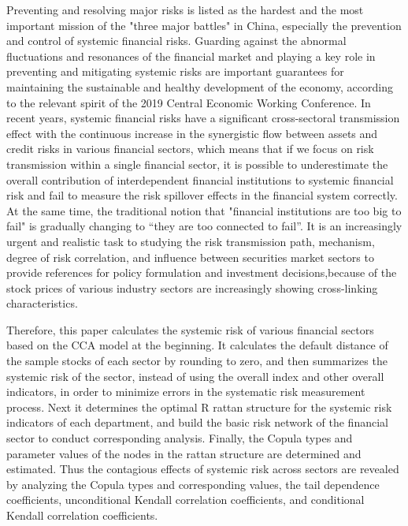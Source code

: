 \begin{eabstract}
  Preventing and resolving major risks is listed as the hardest and the most
  important mission of the "three major battles" in China, especially the
  prevention and control of systemic financial risks. Guarding against the
  abnormal fluctuations and resonances of the financial market and playing a key
  role in preventing and mitigating systemic risks are important guarantees for
  maintaining the sustainable and healthy development of the economy, according
  to the relevant spirit of the 2019 Central Economic Working Conference. In
  recent years, systemic financial risks have a significant cross-sectoral
  transmission effect with the continuous increase in the synergistic flow
  between assets and credit risks in various financial sectors, which means that
  if we focus on risk transmission within a single financial sector, it is
  possible to underestimate the overall contribution of interdependent financial
  institutions to systemic financial risk and fail to measure the risk spillover
  effects in the financial system correctly. At the same time, the traditional
  notion that "financial institutions are too big to fail" is gradually changing
  to “they are too connected to fail”. It is an increasingly urgent and
  realistic task to studying the risk transmission path, mechanism, degree of
  risk correlation, and influence between securities market sectors to provide
  references for policy formulation and investment decisions,because of the
  stock prices of various industry sectors are increasingly showing
  cross-linking characteristics.

  Therefore, this paper calculates the systemic risk of various financial
  sectors based on the CCA model at the beginning. It calculates the default
  distance of the sample stocks of each sector by rounding to zero, and then
  summarizes the systemic risk of the sector, instead of using the overall index
  and other overall indicators, in order to minimize errors in the systematic
  risk measurement process. Next it determines the optimal R rattan structure
  for the systemic risk indicators of each department, and build the basic risk
  network of the financial sector to conduct corresponding analysis. Finally,
  the Copula types and parameter values of the nodes in the rattan structure are
  determined and estimated. Thus the contagious effects of systemic risk across
  sectors are revealed by analyzing the Copula types and corresponding values,
  the tail dependence coefficients, unconditional Kendall correlation
  coefficients, and conditional Kendall correlation coefficients.


\end{eabstract}
